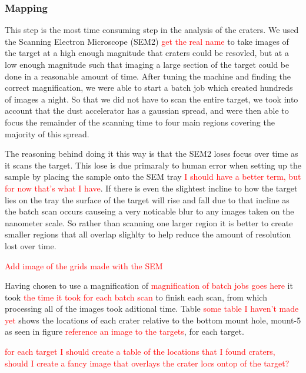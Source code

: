 \documentclass[review]{elsarticle}
\begin{document}
			\subsubsection{Mapping}
			This step is the most time consuming step in the analysis of the craters. We used the Scanning Electron Microscope (SEM2) \textcolor{red}{get the real name} to take images
			of the target at a high enough magnitude that craters could be resovled, but at a low enough magnitude such that imaging a large section of the target could be done 
			in a reasonable amount of time. After tuning the machine and finding the correct magnification, we were able to start a batch job which created hundreds of 
			images a night. So that we did not have to scan the entire target, we took into account that the dust accelerator has a gaussian spread, and were then able to 
			focus the remainder of the scanning time to four main regions covering the majority of this spread. 
			
			The reasoning behind doing it this way is that the SEM2 loses focus over time as it scans the target. This lose is due primaraly to human error when setting up the sample 
			by placing the sample onto the SEM tray \textcolor{red}{I should have a better term, but for now that's what I have}. If there is even the slightest incline to how the 
			target lies on the tray the surface of the target will rise and fall due to that incline as the batch scan occurs causeing a very noticable blur to any images 
			taken on the nanometer scale. So rather than scanning one larger region it is better to create smaller regions that all overlap slighlty to help reduce the amount of 
			resolution lost over time. 

			\textcolor{red}{Add image of the grids made with the SEM} 

			Having chosen to use a magnification of \textcolor{red}{magnification of batch jobs goes here} it took \textcolor{red}{the time it took for each batch scan} to 
			finish each scan, from which processing all of the images took aditional time. Table \textcolor{red}{some table I haven't made yet} shows the locations of each crater
			relative to the bottom mount hole, mount-5 as seen in figure \textcolor{red}{reference an image to the targets}, for each target.  


			\textcolor{red}{for each target I should create a table of the locations that I found craters, should I create a fancy image that overlays the crater locs ontop of the target?}
\end{document}
